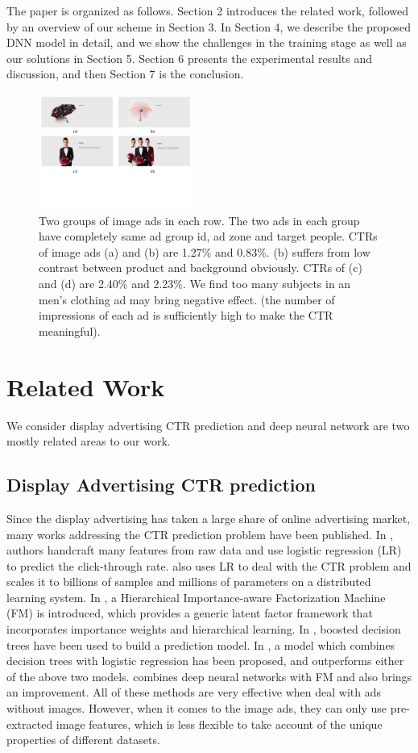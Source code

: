 \documentclass{sig-alternate}
\begin{document}
The paper is organized as follows. Section 2 introduces the related work, followed by an overview of our scheme in Section 3. In Section 4, we describe the proposed DNN model in detail, and we show the challenges in the training stage as well as our solutions  in Section 5. Section 6 presents the experimental results and discussion, and then Section 7 is the conclusion.   
\begin{figure}
	\centering
	\includegraphics[width=0.45\textwidth]{compare}
	\caption{Two groups of image ads in each row. The two ads in each group have completely same ad group id, ad zone and target people. CTRs of image ads (a) and (b) are 1.27\% and 0.83\%. (b) suffers from  low contrast between product and background obviously. CTRs of (c) and (d) are 2.40\% and 2.23\%. We find too many subjects in an men's clothing ad may bring  negative effect. (the number of impressions of each ad is sufficiently high to make the CTR meaningful).}
	\label{fig:compare}
\end{figure}
\section{Related Work}
We consider display advertising CTR prediction and deep neural network are two mostly related areas to our work.
\subsection{Display Advertising CTR prediction}
Since the display advertising has taken a large share of online advertising market, many works addressing the CTR prediction problem have been published. In \cite{richardson2007predicting,chakrabarti2008contextual}, authors handcraft many features from raw data and use logistic regression (LR) to predict the click-through rate. \cite{chapelle2014simple} also uses LR to deal with the CTR problem and scales it to
billions of samples and millions of parameters on a distributed learning system.  In \cite{oentaryo2014predicting},  a Hierarchical Importance-aware Factorization Machine (FM)  \cite{rendle2012factorization} is introduced, which provides a generic latent factor framework that incorporates importance weights and hierarchical learning. In \cite{dave2010learning}, boosted decision trees have been used to build a prediction model. In \cite{he2014practical},  a model which combines decision
trees with logistic regression has been proposed, and outperforms either of the above two models. \cite{zhang2016deep} combines deep neural networks with FM and also brings  an improvement. All of these methods are very effective when deal with ads without images. However, when it comes to the image ads, they can only use pre-extracted image features, which is less flexible to take account of the unique properties of different datasets.
\end{document}
